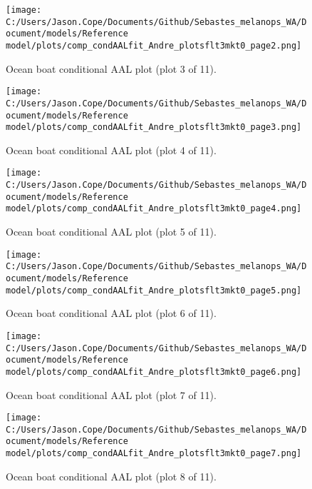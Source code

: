 \documentclass[11pt,
  english,
  letterpaper,
]{article}
\begin{document}
\begin{figure}
\centering
\texttt{[image: C:/Users/Jason.Cope/Documents/Github/Sebastes\_melanops\_WA/Document/models/Reference model/plots/comp\_condAALfit\_Andre\_plotsflt3mkt0\_page2.png]}
\caption{Ocean boat conditional AAL plot (plot 3 of 11).\label{fig:comp_condAALfit_Andre_plotsflt3mkt0_page2}}
\end{figure}

\begin{figure}
\centering
\texttt{[image: C:/Users/Jason.Cope/Documents/Github/Sebastes\_melanops\_WA/Document/models/Reference model/plots/comp\_condAALfit\_Andre\_plotsflt3mkt0\_page3.png]}
\caption{Ocean boat conditional AAL plot (plot 4 of 11).\label{fig:comp_condAALfit_Andre_plotsflt3mkt0_page3}}
\end{figure}

\begin{figure}
\centering
\texttt{[image: C:/Users/Jason.Cope/Documents/Github/Sebastes\_melanops\_WA/Document/models/Reference model/plots/comp\_condAALfit\_Andre\_plotsflt3mkt0\_page4.png]}
\caption{Ocean boat conditional AAL plot (plot 5 of 11).\label{fig:comp_condAALfit_Andre_plotsflt3mkt0_page4}}
\end{figure}

\begin{figure}
\centering
\texttt{[image: C:/Users/Jason.Cope/Documents/Github/Sebastes\_melanops\_WA/Document/models/Reference model/plots/comp\_condAALfit\_Andre\_plotsflt3mkt0\_page5.png]}
\caption{Ocean boat conditional AAL plot (plot 6 of 11).\label{fig:comp_condAALfit_Andre_plotsflt3mkt0_page5}}
\end{figure}

\begin{figure}
\centering
\texttt{[image: C:/Users/Jason.Cope/Documents/Github/Sebastes\_melanops\_WA/Document/models/Reference model/plots/comp\_condAALfit\_Andre\_plotsflt3mkt0\_page6.png]}
\caption{Ocean boat conditional AAL plot (plot 7 of 11).\label{fig:comp_condAALfit_Andre_plotsflt3mkt0_page6}}
\end{figure}

\begin{figure}
\centering
\texttt{[image: C:/Users/Jason.Cope/Documents/Github/Sebastes\_melanops\_WA/Document/models/Reference model/plots/comp\_condAALfit\_Andre\_plotsflt3mkt0\_page7.png]}
\caption{Ocean boat conditional AAL plot (plot 8 of 11).\label{fig:comp_condAALfit_Andre_plotsflt3mkt0_page7}}
\end{figure}
\end{document}
